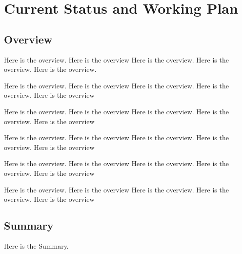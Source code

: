 \ifx\allfiles\undefined
	
	
\else
	
\fi
\chapter{Current Status and Working Plan}
\section{Overview}
Here is the overview. Here is the overview Here is the overview. Here is the overview. Here is the overview.

Here is the overview. Here is the overview Here is the overview. Here is the overview. Here is the overview

Here is the overview. Here is the overview Here is the overview. Here is the overview. Here is the overview

Here is the overview. Here is the overview Here is the overview. Here is the overview. Here is the overview

Here is the overview. Here is the overview Here is the overview. Here is the overview. Here is the overview

Here is the overview. Here is the overview Here is the overview. Here is the overview. Here is the overview
\section{Summary}\label{sec:Chapter4summary}
Here is the Summary.

\ifx\allfiles\undefined
	\onehalfspacing
	
	
	
\fi


